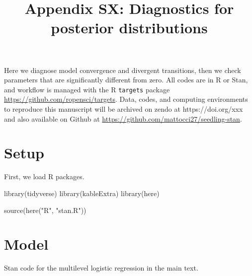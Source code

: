 \documentclass[
  11pt,
  letterpaper,
  DIV=11,
  numbers=noendperiod]{scrartcl}
\title{Appendix SX: Diagnostics for posterior distributions}
\author{}
\date{}
\newenvironment{Shaded}{}{}
\newcommand{\FunctionTok}[1]{\textcolor[rgb]{0.44,0.26,0.76}{#1}}
\newcommand{\NormalTok}[1]{\textcolor[rgb]{0.14,0.16,0.18}{#1}}
\newcommand{\StringTok}[1]{\textcolor[rgb]{0.01,0.18,0.38}{#1}}
\renewcommand*\contentsname{Table of contents}
\newcommand\contentsname{Table of contents}
\begin{document}
\maketitle
\ifdefined\Shaded\renewenvironment{Shaded}{\begin{tcolorbox}[boxrule=0pt, borderline west={3pt}{0pt}{shadecolor}, breakable, interior hidden, enhanced, sharp corners, frame hidden]}{\end{tcolorbox}}\fi

\renewcommand*\contentsname{Table of contents}
{
\hypersetup{linkcolor=}
\setcounter{tocdepth}{3}
\tableofcontents
}
\newpage

Here we diagnose model convergence and divergent transitions, then we
check parameters that are significantly different from zero. All codes
are in R or Stan, and workflow is managed with the R \texttt{targets}
package \url{https://github.com/ropensci/targets}. Data, codes, and
computing environments to reproduce this manuscript will be archived on
zendo at https://doi.org/xxx and also available on Github at
\url{https://github.com/mattocci27/seedling-stan}.

\hypertarget{setup}{%
\section{Setup}\label{setup}}

First, we load R packages.

\begin{Shaded}
\begin{Highlighting}[]
\FunctionTok{library}\NormalTok{(tidyverse)}
\FunctionTok{library}\NormalTok{(kableExtra)}
\FunctionTok{library}\NormalTok{(here)}
\end{Highlighting}
\end{Shaded}

\begin{Shaded}
\begin{Highlighting}[]
\FunctionTok{source}\NormalTok{(}\FunctionTok{here}\NormalTok{(}\StringTok{"R"}\NormalTok{, }\StringTok{"stan.R"}\NormalTok{))}
\end{Highlighting}
\end{Shaded}

\hypertarget{model}{%
\section{Model}\label{model}}

Stan code for the multilevel logistic regression in the main text.
\end{document}
